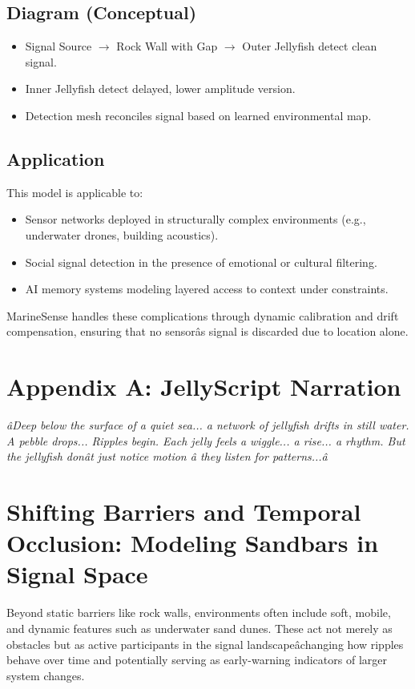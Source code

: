 \documentclass[11pt]{article}
\begin{document}
\subsection{Diagram (Conceptual)}
\begin{itemize}
  \item Signal Source $\rightarrow$ Rock Wall with Gap $\rightarrow$ Outer Jellyfish detect clean signal.
  \item Inner Jellyfish detect delayed, lower amplitude version.
  \item Detection mesh reconciles signal based on learned environmental map.
\end{itemize}

\subsection{Application}
This model is applicable to:
\begin{itemize}
  \item Sensor networks deployed in structurally complex environments (e.g., underwater drones, building acoustics).
  \item Social signal detection in the presence of emotional or cultural filtering.
  \item AI memory systems modeling layered access to context under constraints.
\end{itemize}

MarineSense handles these complications through dynamic calibration and drift compensation, ensuring that no sensorâs signal is discarded due to location alone.

\section*{Appendix A: JellyScript Narration}
\textit{âDeep below the surface of a quiet sea... a network of jellyfish drifts in still water. A pebble drops... Ripples begin. Each jelly feels a wiggle... a rise... a rhythm. But the jellyfish donât just notice motion â they listen for patterns...â}


\section{Shifting Barriers and Temporal Occlusion: Modeling Sandbars in Signal Space}
Beyond static barriers like rock walls, environments often include soft, mobile, and dynamic features such as underwater sand dunes. These act not merely as obstacles but as active participants in the signal landscapeâchanging how ripples behave over time and potentially serving as early-warning indicators of larger system changes.
\end{document}
